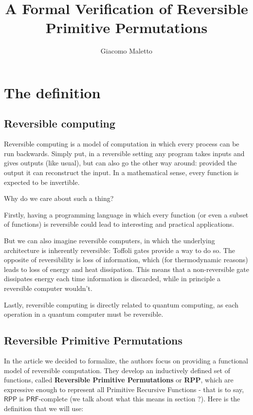 \documentclass{book}
\title{A Formal Verification of Reversible Primitive Permutations}
\author{Giacomo Maletto}
\date{}
\theoremstyle{definition}
\theoremstyle{remark}
\theoremstyle{plain}
\newcommand{\RPP}{\mathsf{RPP}}
\newcommand{\PRF}{\mathsf{PRF}}
\begin{document}
\maketitle

\chapter{The definition}

\section{Reversible computing}

Reversible computing is a model of computation in which every process can be run backwards.
Simply put, in a reversible setting any program takes inputs and gives outputs (like usual), but can also go the other way around:
provided the output it can reconstruct the input.
In a mathematical sense, every function is expected to be invertible.

Why do we care about such a thing?

Firstly, having a programming language in which every function (or even a subset of functions) is reversible could lead to interesting and practical applications.

But we can also imagine reversible computers, in which the underlying architecture is inherently reversible:
Toffoli gates provide a way to do so.
The opposite of reversibility is loss of information, which (for thermodynamic reasons) leads to loss of energy and heat dissipation.
This means that a non-reversible gate dissipates energy each time information is discarded, while in principle a reversible computer wouldn't.

Lastly, reversible computing is directly related to quantum computing, as each operation in a quantum computer must be reversible.


\section{Reversible Primitive Permutations}

In the article we decided to formalize, the authors focus on providing a functional model of reversible computation.
They develop an inductively defined set of functions, called \textbf{Reversible Primitive Permutations} or \textbf{RPP},
which are expressive enough to represent all Primitive Recursive Functions -
that is to say, $\RPP$ is $\PRF$-complete (we talk about what this means in section ?).
Here is the definition that we will use:
\end{document}
